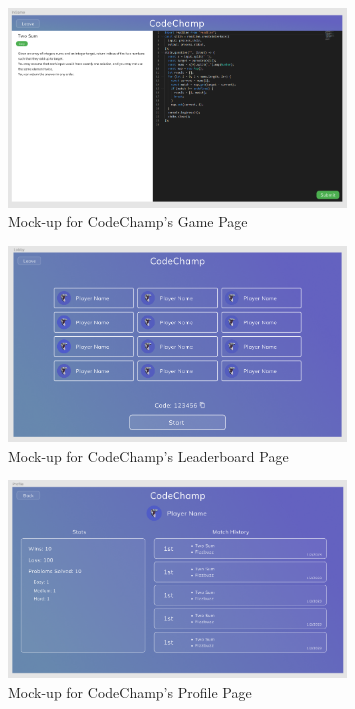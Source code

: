 \documentclass[12pt, titlepage]{article}
\begin{document}
\begin{figure}[H]
\centering
\includegraphics[width=0.8\textwidth]{Design/SystDesign/GamePage.png}
\caption{Mock-up for CodeChamp's Game Page}
\end{figure}

\begin{figure}[H]
\centering
\includegraphics[width=0.8\textwidth]{Design/SystDesign/LeaderboardPage.png}
\caption{Mock-up for CodeChamp's Leaderboard Page}
\end{figure}

\begin{figure}[H]
\centering
\includegraphics[width=0.8\textwidth]{Design/SystDesign/ProfilePage.png}
\caption{Mock-up for CodeChamp's Profile Page}
\end{figure}
\end{document}
